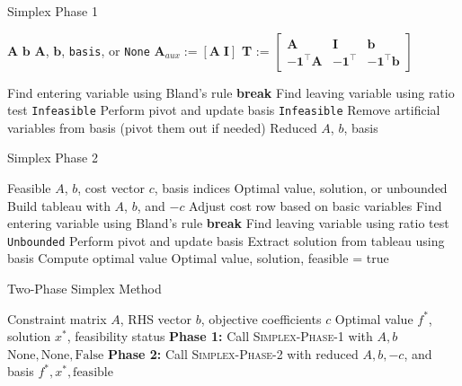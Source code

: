 \documentclass[conference]{IEEEtran}
\begin{document}
\begin{algorithm}
\caption{Simplex Phase 1}
\label{alg:phase1}
\begin{algorithmic}[1]
\Require $\textbf{A}$ $\textbf{b}$
\Ensure  $\textbf{A}$, $\textbf{b}$, \texttt{basis}, or \texttt{None}
\State $\textbf{A}_{aux} := [\textbf{A} \; \textbf{I}]$
\State \textbf{T} := 
$\begin{bmatrix}
\textbf{A} & \textbf{I} & \textbf{b} \\
-\mathbf{1}^\top \textbf{A} & -\mathbf{1}^\top & -\mathbf{1}^\top \textbf{b}
\end{bmatrix}$

    \State Find entering variable using Bland's rule
        \State \textbf{break}
    \EndIf
    \State Find leaving variable using ratio test
        \State \Return \texttt{Infeasible}
    \EndIf
    \State Perform pivot and update basis
\EndWhile
{}
    \State \Return \texttt{Infeasible}
\EndIf
\State Remove artificial variables from basis (pivot them out if needed)
\State \Return Reduced $A$, $b$, basis
\end{algorithmic}
\end{algorithm}

\begin{algorithm}
\caption{Simplex Phase 2}
\label{alg:phase2}
\begin{algorithmic}[1]
\Require Feasible $A$, $b$, cost vector $c$, basis indices
\Ensure Optimal value, solution, or unbounded
\State Build tableau with $A$, $b$, and $-c$
\State Adjust cost row based on basic variables
    \State Find entering variable using Bland's rule
        \State \textbf{break}
    \EndIf
    \State Find leaving variable using ratio test
        \State \Return \texttt{Unbounded}
    \EndIf
    \State Perform pivot and update basis
\EndWhile
\State Extract solution from tableau using basis
\State Compute optimal value
\State \Return Optimal value, solution, feasible = true
\end{algorithmic}
\end{algorithm}

\begin{algorithm}[H]
    \caption{Two-Phase Simplex Method}
    \label{alg:two_phase_simplex}
    \begin{algorithmic}[1]
    \Require Constraint matrix \( A \), RHS vector \( b \), objective coefficients \( c \)
    \Ensure Optimal value \( f^* \), solution \( x^* \), feasibility status
    \State \textbf{Phase 1:} Call \textsc{Simplex-Phase-1} with \( A, b \)
        \State \Return \( \text{None}, \text{None}, \text{False} \)
    \EndIf
    \State \textbf{Phase 2:} Call \textsc{Simplex-Phase-2} with reduced \( A, b, -c \), and basis
    \State \Return \( f^*, x^*, \text{feasible} \)
    \end{algorithmic}
\end{algorithm}
\end{document}
